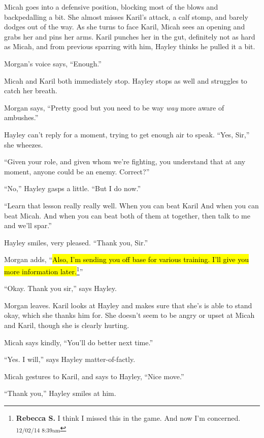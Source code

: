 Micah goes into a defensive position, blocking most of the blows and backpedalling a bit.  She almost misses Karil's attack, a calf stomp, and barely dodges out of the way.  As she turns to face Karil, Micah sees an opening and grabs her and pins her arms.  Karil punches her in the gut, definitely not as hard as Micah, and from previous sparring with him, Hayley thinks he pulled it a bit.



Morgan's voice says, ``Enough.''



Micah and Karil both immediately stop.  Hayley stops as well and struggles to catch her breath.

Morgan says, ``Pretty good but you need to be way \textit{way} more aware of ambushes.''

Hayley can't reply for a moment, trying to get enough air to speak.  ``Yes, Sir,'' she wheezes.

``Given your role, and given whom we're fighting, you understand that at any moment, anyone could be an enemy.  Correct?''

``No,'' Hayley gasps a little. ``But I do now.''

``Learn that lesson really really well.  When you can beat Karil  And when you can beat Micah.  And when you can beat both of them at together, then talk to me and we'll spar.''

Hayley smiles, very pleased. ``Thank you, Sir.''

Morgan adds, ``\hl{Also, I'm sending you off base for various training.  I'll give you more information later.}\footnote{\textbf{Rebecca S. }I think I missed this in the game.
And now I'm concerned. \textsubscript{12/02/14 8:39am}}''

``Okay.  Thank you sir,'' says Hayley.



Morgan leaves.  Karil looks at Hayley and makes sure that she's is able to stand okay, which she thanks him for.  She doesn't seem to be angry or upset at Micah and Karil, though she is clearly hurting.

Micah says kindly, ``You'll do better next time.''

``Yes.  I will,'' says Hayley matter-of-factly.

Micah gestures to Karil, and says to Hayley, ``Nice move.''

``Thank you,'' Hayley smiles at him.




